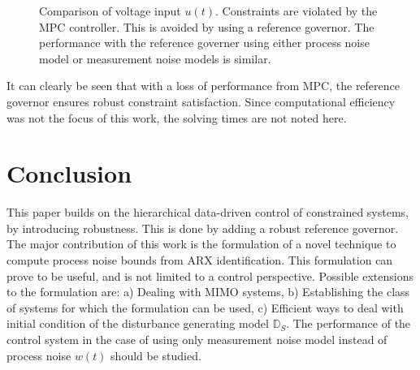 \documentclass[letterpaper, 10 pt, conference]{ieeeconf}  %
\begin{document}
\begin{enumerate}
\begin{figure}[h]
		\caption{Comparison of voltage input $u(t)$. Constraints are violated by the MPC controller. This is avoided by using a reference governor. The performance with the reference governer using either process noise model or measurement noise models is similar.}
		\label{VRFT_u}
	\end{figure}
	It can clearly be seen that with a loss of performance from MPC, the reference governor ensures robust constraint satisfaction. Since computational efficiency was not the focus of this work, the solving times are not noted here.
	\section{Conclusion}
	This paper builds on the hierarchical data-driven control of constrained systems, by introducing robustness. This is done by adding a robust reference governor. The major contribution of this work is the formulation of a novel technique to compute process noise bounds from ARX identification. This formulation can prove to be useful, and is not limited to a control perspective. Possible extensions to the formulation are: a) Dealing with MIMO systems, b) Establishing the class of systems for which the formulation can be used, c) Efficient ways to deal with initial condition of the disturbance generating model $\mathbb{D}_S$. The performance of the control system in the case of using only measurement noise model instead of process noise $w(t)$ should be studied.
\end{enumerate} 

	
                                                              



\end{document}
